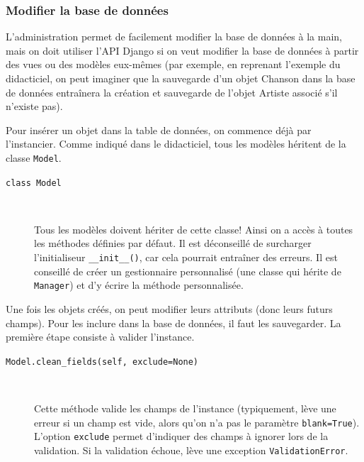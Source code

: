 \documentclass[a4paper, 10pt]{article}
\begin{document}
{\subsubsection{Modifier la base de données}
L'administration  permet de facilement modifier la base de données à la main, mais on doit utiliser l'API Django si on veut modifier la base de données à partir des vues ou des modèles eux-mêmes (par exemple, en reprenant l'exemple du didacticiel, on peut imaginer que la sauvegarde d'un objet Chanson dans la base de données entraînera la création et sauvegarde de l'objet Artiste associé s'il n'existe pas).\bigskip

Pour insérer un objet dans la table de données, on commence déjà par l'instancier. Comme indiqué dans le didacticiel, tous les modèles héritent de la classe \texttt{Model}.

\begin{description}
    \item[\texttt{class Model}]~

    Tous les modèles doivent hériter de cette classe! Ainsi on a accès à toutes les méthodes définies par défaut. Il est déconseillé de surcharger l'initialiseur \texttt{__init__()}, car cela pourrait entraîner des erreurs. Il est conseillé de créer un gestionnaire personnalisé (une classe qui hérite de \texttt{Manager}) et d'y écrire la méthode personnalisée.
\end{description}

Une fois les objets créés, on peut modifier leurs attributs (donc leurs futurs champs). Pour les inclure dans la base de données, il faut les sauvegarder. La première étape consiste à valider l'instance.

\begin{description}
    \item[\texttt{Model.clean_fields(self, exclude=None)}]~

    Cette méthode valide les champs de l'instance (typiquement, lève une erreur si un champ est vide, alors qu'on n'a pas le paramètre \texttt{blank=True}). L'option \texttt{exclude} permet d'indiquer des champs à ignorer lors de la validation. Si la validation échoue, lève une exception \texttt{ValidationError}.


\end{description}}
\end{document}
